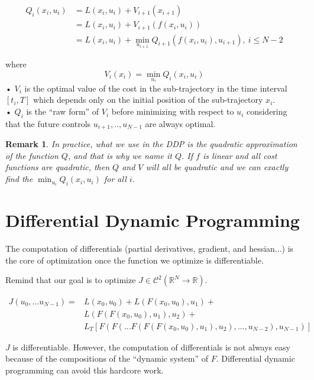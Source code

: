 \documentclass{report}
\newtheorem*{remark}{Remark}
\begin{document}
\begin{equation}
\begin{split}
Q_i(x_i,u_i) &= L(x_i,u_i) + V_{i+1}(x_{i+1}) \\
				&= L(x_i,u_i) + V_{i+1}(f(x_i,u_i)) \\
				&= L(x_i,u_i) + \min_{u_{i+1}} Q_{i+1}(f(x_i,u_i), u_{i+1}),\ i \le N-2
\end{split}
\end{equation}

where
\begin{equation}
V_i(x_i) = \min_{u_i} Q_i(x_i, u_i) 
\end{equation}•
$V_i$ is the optimal value of the cost in the sub-trajectory in the time interval $[t_i, T]$ which depends only on the initial position of the sub-trajectory $x_i$.
\\•
$Q_i$ is the ``raw form'' of $V_i$ before minimizing with respect to $u_i$ considering that the future controls $u_{i+1}, .., u_{N-1}$ are always optimal. 

\begin{remark}
In practice, what we use in the DDP is the quadratic approximation of the function $Q$, and that is why we name it $Q$. If $f$ is linear and all cost functions are quadratic, then $Q$ and $V$ will all be quadratic and we can exactly find the $\min_{u_i} Q_i(x_i, u_i) $ for all $i$.
\end{remark}

\chapter{Differential Dynamic Programming}

The computation of differentials (partial derivatives, gradient, and hessian...) is the core of optimization once the function we optimize is differentiable.

Remind that our goal is to optimize $J \in \mathscr{C}^2 (\mathbb{R}^N \to \mathbb{R})$.

\begin{equation}
\begin{split}
J(u_0, ...u_{N-1}) = &L(x_0, u_0) + L(F(x_0, u_0), u_1) + \\
	&L(F(F(x_0, u_0), u_1), u_2) + \\
	&L_T[F(F(...F(F(F(x_0, u_0), u_1), u_2), ..., u_{N-2}) ,u_{N-1})]
\end{split}
\end{equation}

$J$ is differentiable. However, the computation of differentials is not always easy because of the compositions of the ``dynamic system'' of $F$. Differential dynamic programming can avoid this hardcore work.
\end{document}
